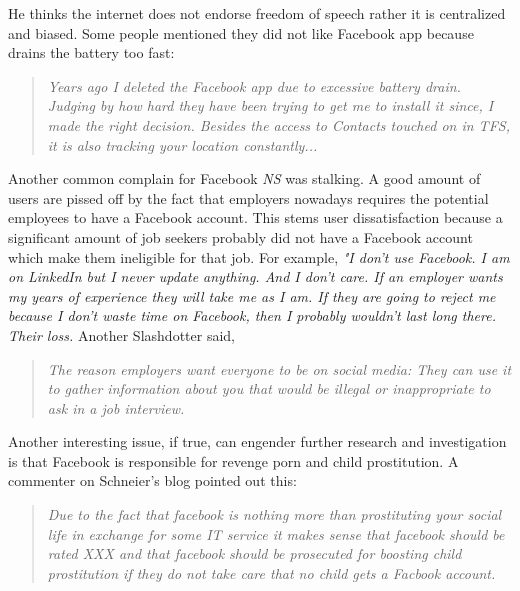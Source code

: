 He thinks the internet does not endorse freedom of speech rather it is centralized and biased. Some people mentioned they did not like Facebook app because drains the battery too fast:
\begin{quote}
         \textit{Years ago I deleted the Facebook app due to excessive battery drain. Judging by how hard they have been trying to get me to install it since, I made the right decision. Besides the access to Contacts touched on in TFS, it is also tracking your location constantly...}
    \end{quote}
    
Another common complain for Facebook \emph{NS} was stalking. A good amount of users are pissed off by the fact that employers nowadays requires the potential employees to have a Facebook account. This stems user dissatisfaction because a significant amount of job seekers probably did not have a Facebook account which make them ineligible for that job. For example, \textit{"I don't use Facebook. I am on LinkedIn but I never update anything. And I don't care. If an employer wants my years of experience they will take me as I am. If they are going to reject me because I don't waste time on Facebook, then I probably wouldn't last long there. Their loss.} Another Slashdotter said,
     \begin{quote}
         \textit{The reason employers want everyone to be on social media: They can use it to gather information about you that would be illegal or inappropriate to ask in a job interview. }
     \end{quote}
     
Another interesting issue, if true, can engender further research and investigation is that Facebook is responsible for revenge porn and child prostitution. A commenter on Schneier's blog pointed out this:
\begin{quote}
         \textit{Due to the fact that facebook is nothing more than prostituting your social life in exchange for some IT service it makes sense that facebook should be rated XXX and that facebook should be prosecuted for boosting child prostitution if they do not take care that no child gets a Facbook account.}
    \end{quote}
 
 

